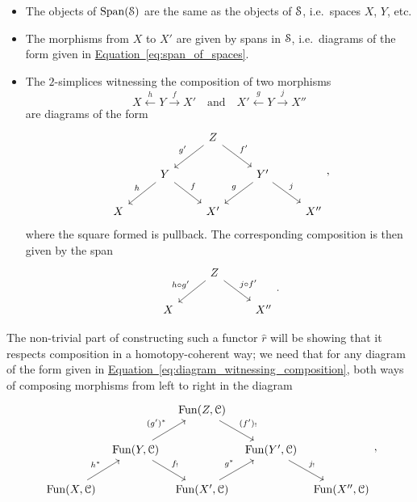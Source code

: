 \documentclass[main.tex]{subfiles}
\begin{document}
\begin{itemize}
  \item The objects of $\Span(\S)$ are the same as the objects of $\S$, i.e.\ spaces $X$, $Y$, etc.

  \item The morphisms from $X$ to $X'$ are given by spans in $\S$, i.e.\ diagrams of the form given in \hyperref[eq:span_of_spaces]{Equation~\ref*{eq:span_of_spaces}}.

  \item The $2$-simplices witnessing the composition of two morphisms
    \begin{equation*}
      X \overset{h}{\leftarrow} Y \overset{f}{\rightarrow} X' \quad\text{and}\quad X' \overset{g}{\leftarrow} Y \overset{j}{\rightarrow} X''
    \end{equation*}
    are diagrams of the form
    \begin{equation}
      \label{eq:diagram_witnessing_composition}
      \begin{tikzcd}
        && Z
        \arrow[dl, swap, "g'"]
        \arrow[dr, "f'"]
        \\
        & Y
        \arrow[dl, swap, "h"]
        \arrow[dr, "f"]
        && Y'
        \arrow[dl, swap, "g"]
        \arrow[dr, "j"]
        \\
        X
        && X'
        && X''
      \end{tikzcd},
    \end{equation}
    where the square formed is pullback. The corresponding composition is then given by the span
    \begin{equation*}
      \begin{tikzcd}
        & Z
        \arrow[dl, swap, "h \circ g'"]
        \arrow[dr, "j \circ f'"]
        \\
        X
        && X''
      \end{tikzcd}.
    \end{equation*}
\end{itemize}
The non-trivial part of constructing such a functor $\hat{r}$ will be showing that it respects composition in a homotopy-coherent way; we need that for any diagram of the form given in \hyperref[eq:diagram_witnessing_composition]{Equation~\ref*{eq:diagram_witnessing_composition}}, both ways of composing morphisms from left to right in the diagram
\begin{equation*}
  \begin{tikzcd}[column sep=tiny]
    && \Fun(Z, \category{C})
    \arrow[dr, "(f')_{!}"]
    \\
    & \Fun(Y, \category{C})
    \arrow[ur, "(g')^{*}"]
    \arrow[dr, "f_{!}"]
    && \Fun(Y', \category{C})
    \arrow[dr, "j_{!}"]
    \\
    \Fun(X, \category{C})
    \arrow[ur, "h^{*}"]
    && \Fun(X', \category{C})
    \arrow[ur, "g^{*}"]
    && \Fun(X'', \category{C})
  \end{tikzcd},
\end{equation*}
\end{document}
